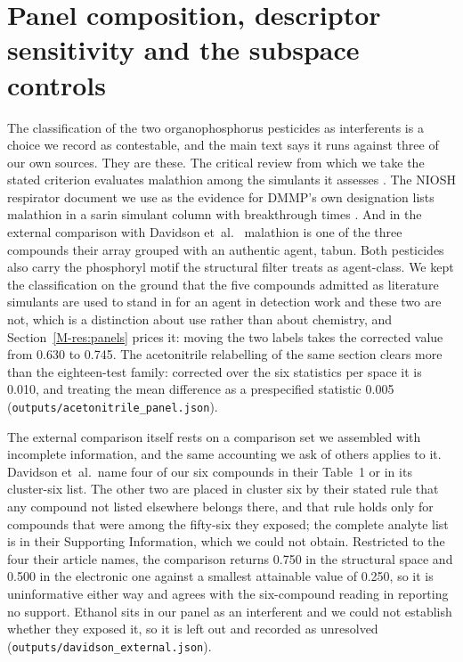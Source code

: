 \documentclass[11pt,a4paper]{article}
\begin{document}
\section{Panel composition, descriptor sensitivity and the subspace controls}
\label{meth:panelsi}

The classification of the two organophosphorus pesticides as interferents is a
choice we record as contestable, and the main text says it runs against three of
our own sources. They are these. The critical review from which we take the
stated criterion evaluates malathion among the simulants it assesses
\cite{webb2025}. The NIOSH respirator document we use as the evidence for DMMP's
own designation lists malathion in a sarin simulant column with breakthrough
times \cite{niosh2002simulant}. And in the external comparison with Davidson
et~al.\ \cite{davidson2020} malathion is one of the three compounds their array
grouped with an authentic agent, tabun. Both pesticides also carry the
phosphoryl motif the structural filter treats as agent-class. We kept the
classification on the ground that the five compounds admitted as literature
simulants are used to stand in for an agent in detection work and these two are
not, which is a distinction about use rather than about chemistry, and
Section~\ref{M-res:panels} prices it: moving the two labels takes the corrected
value from 0.630 to 0.745. The acetonitrile relabelling of the same section
clears more than the eighteen-test family: corrected over the six statistics
per space it is 0.010, and treating the mean difference as a prespecified
statistic 0.005 (\texttt{outputs/acetonitrile\_panel.json}).

The external comparison itself rests on a comparison set we assembled with
incomplete information, and the same accounting we ask of others applies to it.
Davidson et~al.\ name four of our six compounds in their Table~1 or in its
cluster-six list. The other two are placed in cluster six by their stated rule
that any compound not listed elsewhere belongs there, and that rule holds only
for compounds that were among the fifty-six they exposed; the complete analyte
list is in their Supporting Information, which we could not obtain. Restricted
to the four their article names, the comparison returns 0.750 in the structural
space and 0.500 in the electronic one against a smallest attainable value of
0.250, so it is uninformative either way and agrees with the six-compound
reading in reporting no support. Ethanol sits in our panel as an interferent
and we could not establish whether they exposed it, so it is left out and
recorded as unresolved (\texttt{outputs/davidson\_external.json}).
\end{document}
